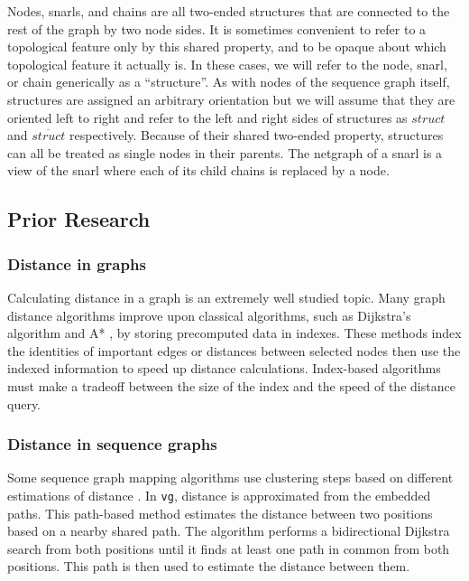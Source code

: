\documentclass[11pt]{ucscthesis}
\begin{document}
Nodes, snarls, and chains are all two-ended structures that are connected to the rest of the graph by two node sides.
It is sometimes convenient to refer to a topological feature only by this shared property, and to be opaque about which topological feature it actually is.
In these cases, we will refer to the node, snarl, or chain generically as a ``structure''.
As with nodes of the sequence graph itself, structures are assigned an arbitrary orientation but we will assume that they are oriented left to right and refer to the left and right sides of structures as $struct$ and $\overline{struct}$ respectively.
Because of their shared two-ended property, structures can all be treated as single nodes in their parents.
The netgraph of a snarl is a view of the snarl where each of its child chains is replaced by a node.



\subsection{Prior Research}

\subsubsection{Distance in graphs}

Calculating distance in a graph is an extremely well studied topic.
Many graph distance algorithms improve upon classical algorithms, such as Dijkstra's algorithm \cite{dijkstra_note_1959} and A* \cite{hart_formal_1968}, by storing precomputed data in indexes.
These methods index the identities of important edges \cite{hutchison_partitioning_2005,lauther_extremely_2004} or distances between selected nodes \cite{dave_topcom:_2015,qiao_approximate_2012,goos_efficient_1997,akiba_fast_2013} then use the indexed information to speed up distance calculations.
Index-based algorithms must make a tradeoff between the size of the index and the speed of the distance query.

\subsubsection{Distance in sequence graphs}

Some sequence graph mapping algorithms use clustering steps based on different estimations of distance \cite{vaddadi_read_2019,garrison_vg_2018}. 
In \texttt{vg}, distance is approximated from the embedded paths.
This path-based method estimates the distance between two positions based on a nearby shared path.
The algorithm performs a bidirectional Dijkstra search from both positions until it finds at least one path in common from both positions.
This path is then used to estimate the distance between them. 
\end{document}
